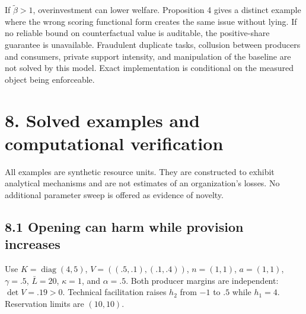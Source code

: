 \documentclass[
  11pt,
]{article}
\begin{document}
If \(\widetilde\beta>1\), overinvestment can lower welfare. Proposition
4 gives a distinct example where the wrong scoring functional form
creates the same issue without lying. If no reliable bound on
counterfactual value is auditable, the positive-share guarantee is
unavailable. Fraudulent duplicate tasks, collusion between producers and
consumers, private support intensity, and manipulation of the baseline
are not solved by this model. Exact implementation is conditional on the
measured object being enforceable.

\section{8. Solved examples and computational
verification}\label{solved-examples-and-computational-verification}

All examples are synthetic resource units. They are constructed to
exhibit analytical mechanisms and are not estimates of an organization's
losses. No additional parameter sweep is offered as evidence of novelty.

\subsection{8.1 Opening can harm while provision
increases}\label{opening-can-harm-while-provision-increases}

Use \(K=\operatorname{diag}(4,5)\), \(V=((.5,.1),(.1,.4))\),
\(n=(1,1)\), \(a=(1,1)\), \(\gamma=.5\), \(\bar L=20\), \(\kappa=1\),
and \(\alpha=.5\). Both producer margins are independent:
\(\det V=.19>0\). Technical facilitation raises \(h_2\) from \(-1\) to
\(.5\) while \(h_1=4\). Reservation limits are \((10,10)\).
\end{document}
